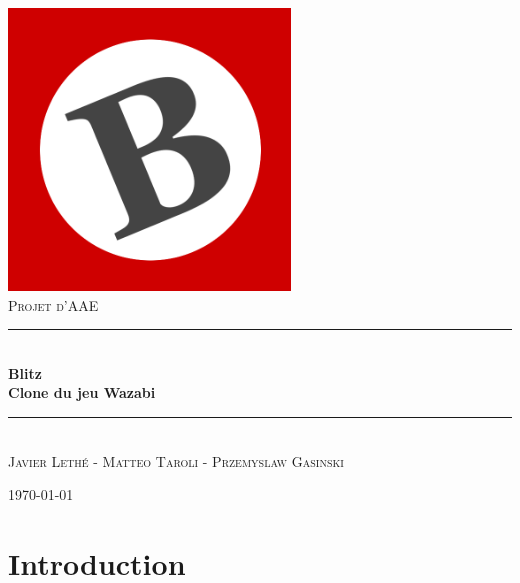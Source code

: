 \documentclass[11pt]{scrreprt}
\begin{document}
    \renewcommand{\labelitemi}{$\bullet$}
    \renewcommand{\labelitemii}{$\circ$}


    \begin{titlepage}
        \begin{center}
            ~\\[1.5cm]
            \includegraphics[width=7.5cm]{images/blitzlogo.png}
            ~\\[1.5cm]


            \textsc{\Large Projet d'AAE}\\[0.5cm]

            \rule{\textwidth}{1pt} \\[0.4cm]
            { \bfseries \Huge{Blitz}\\ \Large{Clone du jeu Wazabi}\\[0.4cm]}

            \rule{\textwidth}{1pt} \\[1.5cm]

            \textsc{Javier Lethé - Matteo Taroli - Przemyslaw Gasinski}

            \vfill

            {\large \today}
            \vfill
        \end{center}
    \end{titlepage}
    \tableofcontents
    \pagebreak

    \setlength{\parskip}{3mm}

    \chapter{Introduction}
\end{document}
